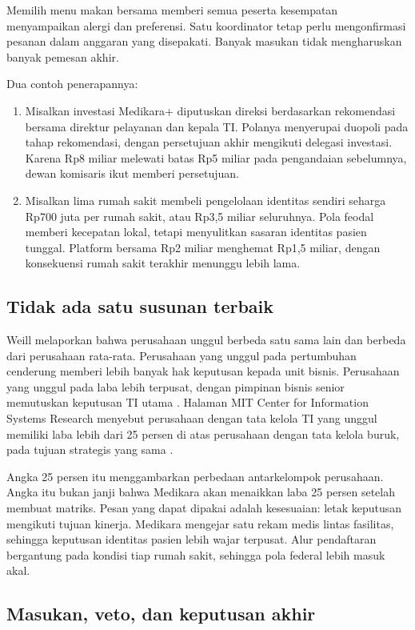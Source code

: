 Memilih menu makan bersama memberi semua peserta kesempatan menyampaikan alergi dan
preferensi. Satu koordinator tetap perlu mengonfirmasi pesanan dalam anggaran yang
disepakati. Banyak masukan tidak mengharuskan banyak pemesan akhir.

Dua contoh penerapannya:
\begin{enumerate}
  \item Misalkan investasi Medikara+ diputuskan direksi berdasarkan rekomendasi bersama
  direktur pelayanan dan kepala TI. Polanya menyerupai duopoli pada tahap rekomendasi,
  dengan persetujuan akhir mengikuti delegasi investasi. Karena Rp8 miliar melewati batas
  Rp5 miliar pada pengandaian sebelumnya, dewan komisaris ikut memberi persetujuan.
  \item Misalkan lima rumah sakit membeli pengelolaan identitas sendiri seharga Rp700 juta
  per rumah sakit, atau Rp3,5 miliar seluruhnya. Pola feodal memberi kecepatan lokal, tetapi
  menyulitkan sasaran identitas pasien tunggal. Platform bersama Rp2 miliar menghemat Rp1,5
  miliar, dengan konsekuensi rumah sakit terakhir menunggu lebih lama.
\end{enumerate}

\subsection*{Tidak ada satu susunan terbaik}

Weill melaporkan bahwa perusahaan unggul berbeda satu sama lain dan berbeda dari perusahaan
rata-rata. Perusahaan yang unggul pada pertumbuhan cenderung memberi lebih banyak hak
keputusan kepada unit bisnis. Perusahaan yang unggul pada laba lebih terpusat, dengan
pimpinan bisnis senior memutuskan keputusan TI utama \cite{c02-weill-misqe}. Halaman MIT
Center for Information Systems Research menyebut perusahaan dengan tata kelola TI yang unggul
memiliki laba lebih dari 25 persen di atas perusahaan dengan tata kelola buruk, pada tujuan
strategis yang sama \cite{weill2004}.

Angka 25 persen itu menggambarkan perbedaan antarkelompok perusahaan. Angka itu bukan janji
bahwa Medikara akan menaikkan laba 25 persen setelah membuat matriks. Pesan yang dapat
dipakai adalah kesesuaian: letak keputusan mengikuti tujuan kinerja. Medikara mengejar satu
rekam medis lintas fasilitas, sehingga keputusan identitas pasien lebih wajar terpusat. Alur
pendaftaran bergantung pada kondisi tiap rumah sakit, sehingga pola federal lebih masuk akal.

\subsection*{Masukan, veto, dan keputusan akhir}

